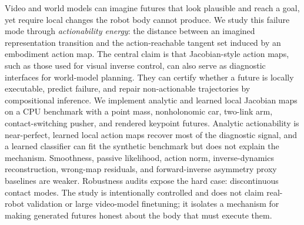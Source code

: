 Video and world models can imagine futures that look plausible and reach a goal, yet require local changes the robot body cannot produce. We study this failure mode through \emph{actionability energy}: the distance between an imagined representation transition and the action-reachable tangent set induced by an embodiment action map. The central claim is that Jacobian-style action maps, such as those used for visual inverse control, can also serve as diagnostic interfaces for world-model planning. They can certify whether a future is locally executable, predict failure, and repair non-actionable trajectories by compositional inference. We implement analytic and learned local Jacobian maps on a CPU benchmark with a point mass, nonholonomic car, two-link arm, contact-switching pusher, and rendered keypoint futures. Analytic actionability is near-perfect, learned local action maps recover most of the diagnostic signal, and a learned classifier can fit the synthetic benchmark but does not explain the mechanism. Smoothness, passive likelihood, action norm, inverse-dynamics reconstruction, wrong-map residuals, and forward-inverse asymmetry proxy baselines are weaker. Robustness audits expose the hard case: discontinuous contact modes. The study is intentionally controlled and does not claim real-robot validation or large video-model finetuning; it isolates a mechanism for making generated futures honest about the body that must execute them.
